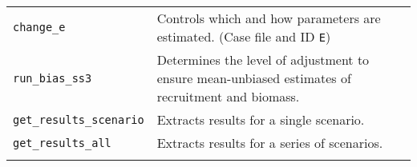 \documentclass[10pt]{article}
\providecommand{\DIFdelbegin}{} %
\begin{document}
\begin{longtable}[c]{@{}ll@{}}
\begin{minipage}[t]{0.32\columnwidth}\raggedright
\texttt{change\_e}
\end{minipage} & \begin{minipage}[t]{0.57\columnwidth}\raggedright
Controls which and how parameters are estimated. (Case file and ID \texttt{E})
\end{minipage}
\\\noalign{\medskip}
\begin{minipage}[t]{0.32\columnwidth}\raggedright
\texttt{run\_bias\_ss3}
\end{minipage} & \begin{minipage}[t]{0.57\columnwidth}\raggedright
Determines the level of adjustment to ensure mean-unbiased estimates of
recruitment and biomass.
\end{minipage}
\\\noalign{\medskip}
\begin{minipage}[t]{0.32\columnwidth}\raggedright
\texttt{get\_results\_scenario}
\end{minipage} & \begin{minipage}[t]{0.57\columnwidth}\raggedright
Extracts results for a single scenario.
\end{minipage}
\\\noalign{\medskip}
\begin{minipage}[t]{0.32\columnwidth}\raggedright
\texttt{get\_results\_all}
\end{minipage} & \begin{minipage}[t]{0.57\columnwidth}\raggedright
Extracts results for a series of scenarios.
\end{minipage}
\\\noalign{\medskip}
\hline
\end{longtable}
\DIFdelbegin %


\end{document}
